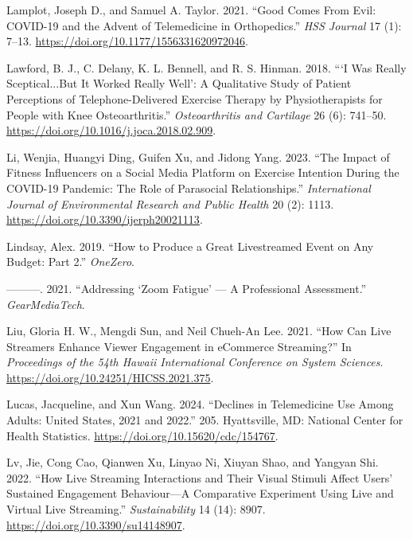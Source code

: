 \documentclass[
  letterpaper,
]{article}
\newlength{\cslhangindent}
\newenvironment{CSLReferences}[2] %
 {\begin{list}{}{%
  \setlength{\itemindent}{0pt}
  \setlength{\leftmargin}{0pt}
  \setlength{\parsep}{0pt}
  \ifodd #1
   \setlength{\leftmargin}{\cslhangindent}
   \setlength{\itemindent}{-1\cslhangindent}
  \fi
  \setlength{\itemsep}{#2\baselineskip}}}
 {\end{list}}
\begin{document}
\begin{CSLReferences}{1}{0}
Lamplot, Joseph D., and Samuel A. Taylor. 2021. {``Good {Comes From
Evil}: {COVID-19} and the {Advent} of {Telemedicine} in
{Orthopedics}.''} \emph{HSS Journal{\textregistered}} 17 (1): 7--13.
\url{https://doi.org/10.1177/1556331620972046}.

Lawford, B. J., C. Delany, K. L. Bennell, and R. S. Hinman. 2018.
{``{`{I} Was Really Sceptical...{But} It Worked Really Well'}: A
Qualitative Study of Patient Perceptions of Telephone-Delivered Exercise
Therapy by Physiotherapists for People with Knee Osteoarthritis.''}
\emph{Osteoarthritis and Cartilage} 26 (6): 741--50.
\url{https://doi.org/10.1016/j.joca.2018.02.909}.

Li, Wenjia, Huangyi Ding, Guifen Xu, and Jidong Yang. 2023. {``The
{Impact} of {Fitness Influencers} on a {Social Media Platform} on
{Exercise Intention} During the {COVID-19 Pandemic}: {The Role} of
{Parasocial Relationships}.''} \emph{International Journal of
Environmental Research and Public Health} 20 (2): 1113.
\url{https://doi.org/10.3390/ijerph20021113}.

Lindsay, Alex. 2019. {``How to {Produce} a {Great Livestreamed Event} on
{Any Budget}: {Part} 2.''} \emph{OneZero}.

---------. 2021. {``Addressing {`{Zoom Fatigue}'} --- {A Professional
Assessment}.''} \emph{GearMediaTech}.

Liu, Gloria H. W., Mengdi Sun, and Neil Chueh-An Lee. 2021. {``How Can
Live Streamers Enhance Viewer Engagement in {eCommerce} Streaming?''} In
\emph{Proceedings of the 54th {Hawaii International Conference} on
{System Sciences}}. \url{https://doi.org/10.24251/HICSS.2021.375}.

Lucas, Jacqueline, and Xun Wang. 2024. {``Declines in Telemedicine Use
Among Adults: {United States}, 2021 and 2022.''} 205. Hyattsville, MD:
National Center for Health Statistics.
\url{https://doi.org/10.15620/cdc/154767}.

Lv, Jie, Cong Cao, Qianwen Xu, Linyao Ni, Xiuyan Shao, and Yangyan Shi.
2022. {``How {Live Streaming Interactions} and {Their Visual Stimuli
Affect Users}' {Sustained Engagement Behaviour}---{A Comparative
Experiment Using Live} and {Virtual Live Streaming}.''}
\emph{Sustainability} 14 (14): 8907.
\url{https://doi.org/10.3390/su14148907}.


\end{CSLReferences}
\end{document}
